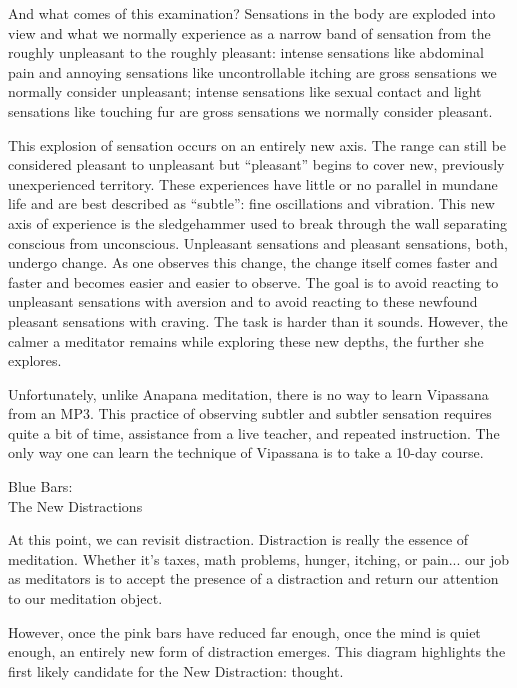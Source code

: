 \documentclass{article}
\begin{document}
And what comes of this examination? Sensations in the body are exploded into view and what we normally experience as a narrow band of sensation from the roughly unpleasant to the roughly pleasant: intense sensations like abdominal pain and annoying sensations like uncontrollable itching are gross sensations we normally consider unpleasant; intense sensations like sexual contact and light sensations like touching fur are gross sensations we normally consider pleasant.

This explosion of sensation occurs on an entirely new axis. The range can still be considered pleasant to unpleasant but ``pleasant'' begins to cover new, previously unexperienced territory. These experiences have little or no parallel in mundane life and are best described as ``subtle'': fine oscillations and vibration. This new axis of experience is the sledgehammer used to break through the wall separating conscious from unconscious. Unpleasant sensations and pleasant sensations, both, undergo change. As one observes this change, the change itself comes faster and faster and becomes easier and easier to observe. The goal is to avoid reacting to unpleasant sensations with aversion and to avoid reacting to these newfound pleasant sensations with craving. The task is harder than it sounds. However, the calmer a meditator remains while exploring these new depths, the further she explores.

Unfortunately, unlike Anapana meditation, there is no way to learn Vipassana from an MP3. This practice of observing subtler and subtler sensation requires quite a bit of time, assistance from a live teacher, and repeated instruction. The only way one can learn the technique of Vipassana is to take a 10-day course.


\pagebreak

\begin{center}
  \Huge{Blue Bars:}\\
  \Huge{The New Distractions}
\end{center}

At this point, we can revisit distraction. Distraction is really the essence of meditation. Whether it's taxes, math problems, hunger, itching, or pain... our job as meditators is to accept the presence of a distraction and return our attention to our meditation object.

However, once the pink bars have reduced far enough, once the mind is quiet enough, an entirely new form of distraction emerges. This diagram highlights the first likely candidate for the New Distraction: thought.
\end{document}
